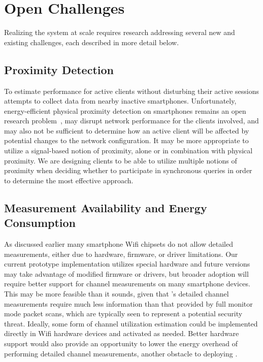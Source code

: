\section{Open Challenges}
\label{sec-challenges}
\newpage

Realizing the \PS{} system at scale requires research addressing several new
and existing challenges, each described in more detail below.

\subsection{Proximity Detection}

To estimate performance for active clients without disturbing their active
sessions \PS{} attempts to collect data from nearby inactive smartphones.
Unfortunately, energy-efficient physical proximity detection on smartphones
remains an open research problem~\cite{searchlight-mobicom12}, may disrupt
network performance for the clients involved, and may also not be sufficient
to determine how an active client will be affected by potential changes to
the network configuration. It may be more appropriate to utilize a
signal-based notion of proximity, alone or in combination with physical
proximity. We are designing \PS{} clients to be able to utilize multiple
notions of proximity when deciding whether to participate in synchronous
queries in order to determine the most effective approach.

\subsection{Measurement Availability and Energy Consumption}

As discussed earlier many smartphone Wifi chipsets do not allow detailed
measurements, either due to hardware, firmware, or driver limitations. Our
current prototype \PS{} implementation utilizes special hardware and future
versions may take advantage of modified firmware or drivers, but broader
adoption will require better support for channel measurements on many
smartphone devices. This may be more feasible than it sounds, given that
\PS{}'s detailed channel measurements require much less information than that
provided by full monitor mode packet scans, which are typically seen to
represent a potential security threat. Ideally, some form of channel
utilization estimation could be implemented directly in Wifi hardware devices
and activated as needed. Better hardware support would also provide an
opportunity to lower the energy overhead of performing detailed channel
measurements, another obstacle to deploying \PS{}.

